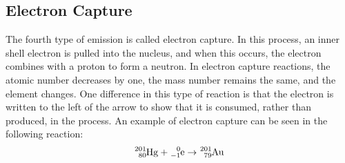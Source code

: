 \subsection{Electron Capture}
The fourth type of emission is called electron capture. In this process, an inner shell electron 
is pulled into the nucleus, and when this occurs, the electron combines with a proton to form a 
neutron. In electron capture reactions, the atomic number decreases by one, the mass number 
remains the same, and the element changes. One difference in this type of reaction is that the 
electron is written to the left of the arrow to show that it is consumed, rather than produced, 
in the process. An example of electron capture can be seen in the following reaction:
\[
    \ch{^{201}_{80}Hg}+\ch{^{0}_{-1}e}\to \ch{^{201}_{79}Au}
\]
